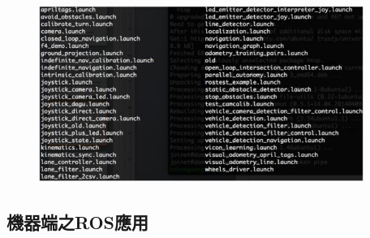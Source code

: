 \documentclass{article}
\begin{document}
\begin{figure}[htp]
    \begin{center}
        \includegraphics[width=300pt]{pic/圖片23.jpg}
    \end{center}
\end{figure}



\subsection{機器端之ROS應用}
\end{document}
